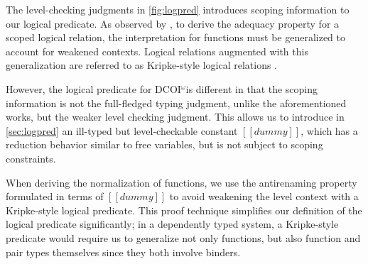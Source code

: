 \documentclass[acmsmall]{acmart}
\makeatletter
\theoremstyle{linked}
\theoremstyle{deflinked}
\theoremstyle{acmdefinition}
\DeclarePairedDelimiter{\bracks}{\llbracket}{\rrbracket}
\newcommand{\name}{\texorpdfstring{DCOI$^{\omega}$\@\xspace}{DCOI-omega}}
\newcommand{\interp}[4]{\bracks{#1 \vDash_{#2} #3} \searrow #4}
\makeatother
\begin{document}
The level-checking judgments in \cref{fig:logpred} introduces scoping information to our
logical predicate. As observed by \citet{abel:normalization}, to
derive the adequacy property for a scoped logical relation, the
interpretation for functions must be generalized to account for
weakened contexts. Logical relations augmented with this
generalization are referred to as Kripke-style logical relations
\citep{abel:poplmark, abel:irrelevance, adjedj:mltt-coq, harper:equivalence}.

However, the logical predicate for \name is different in that the
scoping information is not the full-fledged typing judgment, unlike
the aforementioned works, but the weaker level checking judgment. This
allows us to introduce in \cref{sec:logpred} an ill-typed but
level-checkable constant $[[dummy]]$, which has a reduction behavior similar
to free variables, but is not subject to scoping constraints.

When deriving the normalization of functions, we use the antirenaming
property formulated in terms of $[[dummy]]$ to avoid weakening the level
context with a Kripke-style logical predicate. This proof technique
simplifies our definition of the logical predicate significantly; in a
dependently typed system, a Kripke-style predicate would require us to
generalize not only functions, but also function and pair types themselves
since they both involve binders.
\fi

\end{document}
